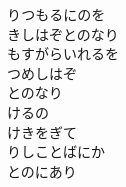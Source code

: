 \documentclass[10pt,b5j]{tarticle} %
\begin{document}
\begin{enumerate}
\begin{minipage}[c]{\blocksize}
        \vspace{\linespace}
        \item
        りつもるにのを\\
        きしはぞとのなり\\
        もすがらいれるを\\
        つめしはぞ\\
        とのなり\\
        けるの\\
        けきをぎて\\
        りしことばにか\\
        とのにあり
    
    \end{minipage}
\end{enumerate} %
\end{document}
